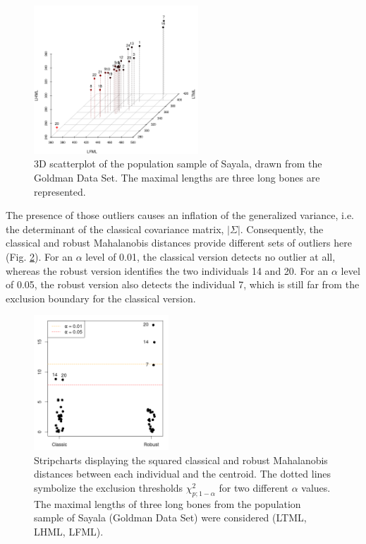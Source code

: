 \documentclass[review, 3p]{elsarticle}
\begin{document}
\begin{figure}[htbp]
\centering
\includegraphics[width=0.55\textwidth]{figures/plot3D-sayala.png}
\caption{\label{fig:org5a644e9}3D scatterplot of the population sample of Sayala, drawn from the Goldman Data Set. The maximal lengths are three long bones are represented.}
\end{figure}

The presence of those outliers causes an inflation of the generalized variance, i.e. the determinant of the classical covariance matrix, \(|\Sigma|\). Consequently, the classical and robust Mahalanobis distances provide different sets of outliers here (Fig. \ref{fig:org30b0333}). For an \(\alpha\) level of 0.01, the classical version detects no outlier at all, whereas the robust version identifies the two individuals 14 and 20. For an \(\alpha\) level of 0.05, the robust version also detects the individual 7, which is still far from the exclusion boundary for the classical version.

\begin{figure}[htbp]
\centering
\includegraphics[width=0.45\textwidth]{figures/maha-dd.png}
\caption{\label{fig:org30b0333}Stripcharts displaying the squared classical and robust Mahalanobis distances between each individual and the centroid. The dotted lines symbolize the exclusion thresholds \(\chi^2_{p;1-\alpha}\) for two different \(\alpha\) values. The maximal lengths of three long bones from the population sample of Sayala (Goldman Data Set) were considered (LTML, LHML, LFML).}
\end{figure}
\end{document}
